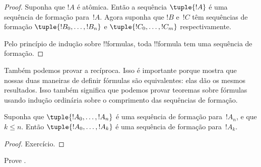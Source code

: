 \documentclass[../../../include/open-logic-section]{subfiles}
\begin{document}
\begin{proof}
Suponha que $!A$ é atômica. Então a sequência $\tuple{!A}$ é uma
sequência de formação para~$!A$.
%
Agora suponha que $!B$ e~$!C$ têm sequências de formação
$\tuple{!B_0,\dotsc,!B_n}$ e $\tuple{!C_0,\dotsc,!C_m}$
respectivamente.
%
\begin{enumerate}
\end{enumerate}
Pelo princípio de indução sobre !!{formula}s,
toda !!{formula} tem uma sequência de formação.
\end{proof}

Também podemos provar a recíproca. Isso é importante porque mostra
que nossas duas maneiras de definir fórmulas são equivalentes: elas dão
os mesmos resultados. Isso também significa que podemos provar teoremas sobre
fórmulas usando indução ordinária sobre o comprimento das sequências de
formação.

\begin{lem}
Suponha que $\tuple{!A_0,\dotsc,!A_n}$ é uma sequência de formação
para~$!A_n$, e que $k \leq n$. Então $\tuple{!A_0,\dotsc,!A_k}$
é uma sequência de formação para~$!A_k$.
\end{lem}

\begin{proof}
Exercício.
\end{proof}

\begin{prob}
Prove .
\end{prob}
\end{document}
